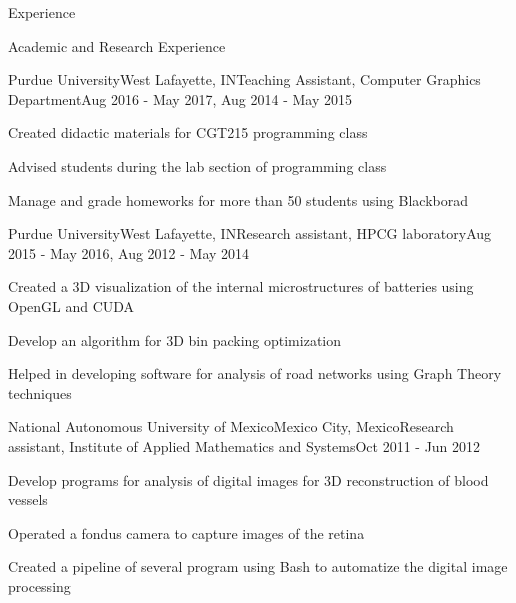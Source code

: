 \documentclass{resume} %
\begin{document}
\begin{rSection}{Experience}

\end{rSection}

\clearpage



\begin{rSection}{Academic and Research Experience}

	\begin{rSubsection}{Purdue University}{West Lafayette, IN}{Teaching Assistant, Computer Graphics Department}{Aug 2016 - May 2017, Aug 2014 - May 2015}
	\item Created didactic materials for CGT215 programming class
	\item Advised students during the lab section of programming class
	\item Manage and grade homeworks for more than 50 students using Blackborad
	\end{rSubsection}

	\begin{rSubsection}{Purdue University}{West Lafayette, IN}{Research assistant, HPCG laboratory}{Aug 2015 - May 2016, Aug 2012 - May 2014}
	\item Created a 3D visualization of the internal microstructures of batteries using OpenGL and CUDA
	\item Develop an algorithm for 3D bin packing optimization
	\item Helped in developing software for analysis of road networks using Graph Theory techniques
	\end{rSubsection}
	
	\begin{rSubsection}{National Autonomous University of Mexico}{Mexico City, Mexico}{Research assistant, Institute of Applied Mathematics and Systems}{Oct 2011 - Jun 2012}
	\item Develop programs for analysis of digital images for 3D reconstruction of blood vessels
	\item Operated a fondus camera to capture images of the retina
	\item Created a pipeline of several program using Bash to automatize the digital image processing
	\end{rSubsection}
	

\end{rSection}
\end{document}
